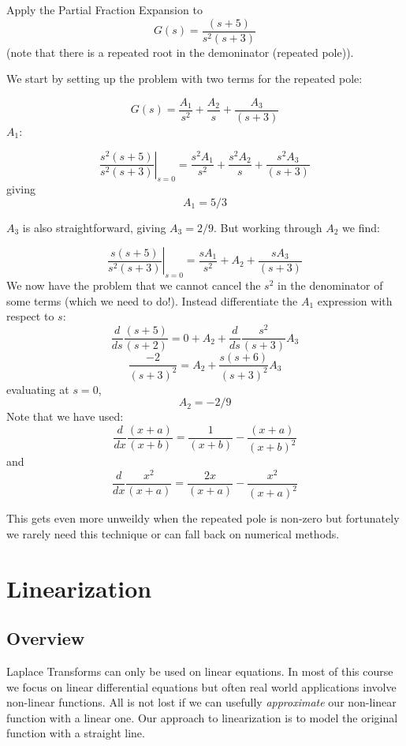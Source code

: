 \begin{ExampleSmall}
Apply the Partial Fraction Expansion to
\[
G(s) = \frac {(s+5)}  {s^2(s+3)}
\]
(note that there is a repeated root  in the demoninator (repeated pole)).

We start by setting up the problem with two terms for the repeated pole:

\[
G(s) = \frac {A_1}{s^2} +  \frac {A_2}{s} +  \frac {A_3}{(s+3)}
\]
$A_1$:

\[
\left . \frac{s^2(s+5)} {s^2(s+3)}\right |_{s=0}  = \frac {s^2A_1}  {s^2}   + \frac{s^2A_2} {s} + \frac {s^2A_3} {(s+3)}
\]
giving
\[
A_1 = 5/3
\]

$A_3$ is also straightforward, giving $A_3 = 2/9$. But working through $A_2$ we find:

\[
\left . \frac{s(s+5)} {s^2(s+3)}\right |_{s=0}  = \frac {sA_1}  {s^2}   + {A_2}  + \frac {sA_3} {(s+3)}
\]
We now have the problem that we cannot cancel the $s^2$ in the denominator of some terms (which we need to do!).   Instead differentiate the $A_1$ expression with respect to $s$:
\[
\frac{d}{ds}\frac{(s+5)}{(s+2)} = 0 + A_2 + \frac{d}{ds} \frac{s^2}{(s+3)}A_3
\]
\[
\frac{-2}{(s+3)^2} = A_2 + \frac{s(s+6)}{(s+3)^2}A_3
\]
evaluating at $s=0$,
\[
A_2 = -2/9
\]
Note that we have used:
\[
\frac{d}{dx}\frac{(x+a)}{(x+b)} = \frac{1}{(x+b)} - \frac{(x+a)}{(x+b)^2}
\]
and
\[
\frac{d}{dx} \frac{x^2}{(x+a)} = \frac{2x}{(x+a)} - \frac{x^2}{(x+a)^2}
\]

This gets even more unweildy when the repeated pole is non-zero but fortunately we rarely need this technique or can fall back on numerical methods.
\end{ExampleSmall}




\section{Linearization}

\subsection{Overview}
Laplace Transforms can only be used on linear equations.  In most of this course we focus on linear differential equations but often real world applications involve non-linear functions.   All is not lost if we can usefully {\it approximate} our non-linear function with a linear one.  Our approach to linearization is to model the original function with a straight line.



